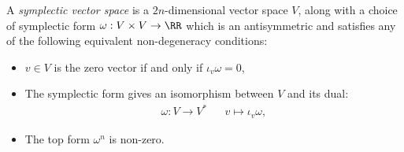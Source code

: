 
 
 A \emph{symplectic vector space} is a $2n$-dimensional vector space $V$, along with a choice of symplectic form $\omega: V\times V\to \RR$ which is an antisymmetric and satisfies any of the following equivalent non-degeneracy conditions:
\begin{itemize}
    \item $v \in V$ is the zero vector if and only if $\iota_v\omega=0$,
    \item The symplectic form gives an isomorphism between $V$ and its dual:
    \begin{align*}
        \omega:V\to V^* &&
        v\mapsto \iota_v\omega,
    \end{align*}
    \item The top form $\omega^{n}$ is non-zero.
\end{itemize}

 